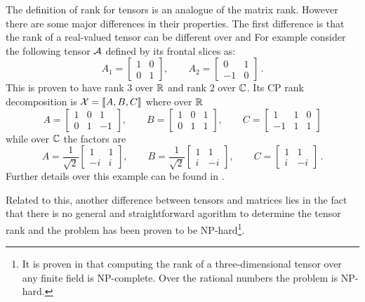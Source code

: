 The definition of rank for tensors is an analogue of the matrix rank. However there are some major differences in their properties.
The first difference is that the rank of a real-valued tensor can be different over \RR and \CC
For example consider the following tensor $\mathcal{A}$ defined by its frontal slices as:
\begin{equation*}
  A_1 = 
  \begin{bmatrix}
    1 & 0\\
    0 & 1
  \end{bmatrix}
  ,\qquad
  A_2 = 
  \begin{bmatrix}
    0 & 1\\
    -1 & 0
  \end{bmatrix}\, .
\end{equation*}
This is proven to have rank $3$ over $\mathbb{R}$ and rank $2$ over $\mathbb{C}$. Its CP rank decomposition is $\mathcal{X} = \llbracket A, B, C \rrbracket$ where over $\mathbb{R}$
\begin{equation*}
  A = 
  \begin{bmatrix}
    1 & 0 & 1\\
    0 & 1 & -1
  \end{bmatrix}
  ,\qquad
  B = 
  \begin{bmatrix}
    1 & 0 & 1\\
    0 & 1 & 1
  \end{bmatrix}
  ,\qquad
  C = 
  \begin{bmatrix}
    1 & 1 & 0\\
    -1 & 1 & 1
  \end{bmatrix}
\end{equation*}
while over $\mathbb{C}$ the factors are
\begin{equation*}
  A = \frac{1}{\sqrt{2}}
  \begin{bmatrix}
    1 & 1\\
    -i & i
  \end{bmatrix}
  ,\qquad
  B = \frac{1}{\sqrt{2}}
  \begin{bmatrix}
    1 & 1\\
    i & -i
  \end{bmatrix}
  ,\qquad
  C = 
  \begin{bmatrix}
    1 & 1\\
    i & -i
  \end{bmatrix}\, .
\end{equation*}
Further details over this example can be found in \cite{tensorreview,kruskalstatement,ten1991kruskal,kruskal1989rank}.

Related to this, another difference between tensors and matrices lies in the fact that there is no general and straightforward agorithm to determine the tensor rank and the problem has been proven to be NP-hard\cite{rankNP}\footnote{It is proven in \cite{rankNP} that computing the rank of a three-dimensional tensor over any finite field is NP-complete. Over the rational numbers the problem is NP-hard.}.


